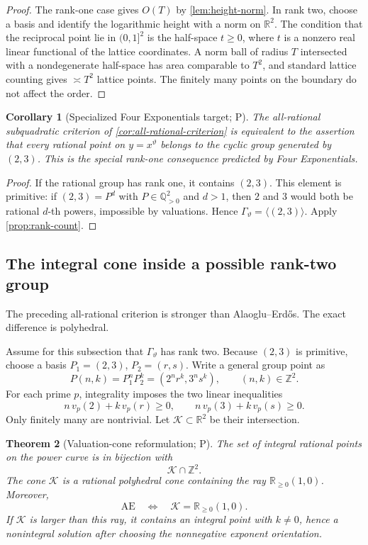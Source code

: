 \documentclass[10pt,oneside]{article}
\newtheorem{theorem}{Theorem}[section]
\newtheorem{corollary}[theorem]{Corollary}
\theoremstyle{definition}
\theoremstyle{remark}
\newcommand{\Z}{\mathbb Z}
\newcommand{\Q}{\mathbb Q}
\newcommand{\R}{\mathbb R}
\newcommand{\thetaq}{\vartheta}
\newcommand{\AEconj}{\mathrm{AE}}
\newcommand{\statusP}{\textsc{P}}
\begin{document}
\begin{proof}
The rank-one case gives \(O(T)\) by \cref{lem:height-norm}.  In rank two, choose a basis and identify the logarithmic height with a norm on \(\R^2\).  The condition that the reciprocal point lie in \((0,1]^2\) is the half-space \(t\ge0\), where \(t\) is a nonzero real linear functional of the lattice coordinates.  A norm ball of radius \(T\) intersected with a nondegenerate half-space has area comparable to \(T^2\), and standard lattice counting gives \(\asymp T^2\) lattice points.  The finitely many points on the boundary do not affect the order.
\end{proof}

\begin{corollary}[Specialized Four Exponentials target; \statusP]
\label{cor:special-four-exp}
The all-rational subquadratic criterion of \cref{cor:all-rational-criterion} is equivalent to the assertion that every rational point on \(y=x^{\thetaq}\) belongs to the cyclic group generated by \((2,3)\).  This is the special rank-one consequence predicted by Four Exponentials.
\end{corollary}

\begin{proof}
If the rational group has rank one, it contains \((2,3)\).  This element is primitive: if \((2,3)=P^d\) with \(P\in\Q_{>0}^2\) and \(d>1\), then \(2\) and \(3\) would both be rational \(d\)-th powers, impossible by valuations.  Hence \(\Gamma_{\thetaq}=\langle(2,3)\rangle\).  Apply \cref{prop:rank-count}.
\end{proof}

\subsection{The integral cone inside a possible rank-two group}
The preceding all-rational criterion is stronger than Alaoglu--Erd\H{o}s.  The exact difference is polyhedral.

Assume for this subsection that \(\Gamma_{\thetaq}\) has rank two.  Because \((2,3)\) is primitive, choose a basis \(P_1=(2,3)\), \(P_2=(r,s)\).  Write a general group point as
\[
 P(n,k)=P_1^nP_2^k=(2^nr^k,3^ns^k),
 \qquad(n,k)\in\Z^2.
\]
For each prime \(p\), integrality imposes the two linear inequalities
\[
 n\,v_p(2)+k\,v_p(r)\ge0,
 \qquad
 n\,v_p(3)+k\,v_p(s)\ge0.
\]
Only finitely many are nontrivial.  Let \(\mathscr K\subset\R^2\) be their intersection.

\begin{theorem}[Valuation-cone reformulation; \statusP]
\label{thm:valuation-cone}
The set of integral rational points on the power curve is in bijection with
\[
 \mathscr K\cap\Z^2.
\]
The cone \(\mathscr K\) is a rational polyhedral cone containing the ray \(\R_{\ge0}(1,0)\).  Moreover,
\[
 \AEconj
 \quad\Longleftrightarrow\quad
 \mathscr K=\R_{\ge0}(1,0).
\]
If \(\mathscr K\) is larger than this ray, it contains an integral point with \(k\ne0\), hence a nonintegral solution after choosing the nonnegative exponent orientation.
\end{theorem}
\end{document}
